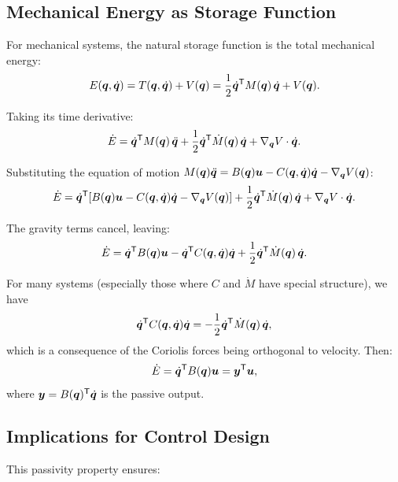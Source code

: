 \subsection{Mechanical Energy as Storage Function}

For mechanical systems, the natural storage function is the total mechanical energy:
\begin{equation}
E(\bm{q},\dot{\bm{q}}) = T(\bm{q},\dot{\bm{q}}) + V(\bm{q})
= \frac{1}{2}\dot{\bm{q}}^{\mathsf{T}} M(\bm{q})\,\dot{\bm{q}} + V(\bm{q}).
\label{eq:ch3:total-energy}
\end{equation}

Taking its time derivative:
\begin{equation}
\dot E = \dot{\bm{q}}^{\mathsf{T}} M(\bm{q})\,\ddot{\bm{q}} + \frac{1}{2}\dot{\bm{q}}^{\mathsf{T}} \dot M(\bm{q})\,\dot{\bm{q}} + \nabla_{\bm{q}} V \cdot \dot{\bm{q}}.
\label{eq:ch3:energy-rate-full}
\end{equation}

Substituting the equation of motion $M(\bm{q})\ddot{\bm{q}} = B(\bm{q})\bm{u} - C(\bm{q},\dot{\bm{q}})\dot{\bm{q}} - \nabla_{\bm{q}} V(\bm{q})$:
\begin{equation}
\dot E = \dot{\bm{q}}^{\mathsf{T}} [B(\bm{q})\bm{u} - C(\bm{q},\dot{\bm{q}})\dot{\bm{q}} - \nabla_{\bm{q}} V(\bm{q})]
+ \frac{1}{2}\dot{\bm{q}}^{\mathsf{T}} \dot M(\bm{q})\,\dot{\bm{q}} + \nabla_{\bm{q}} V \cdot \dot{\bm{q}}.
\label{eq:ch3:energy-substituted}
\end{equation}

The gravity terms cancel, leaving:
\begin{equation}
\dot E = \dot{\bm{q}}^{\mathsf{T}} B(\bm{q})\bm{u} - \dot{\bm{q}}^{\mathsf{T}} C(\bm{q},\dot{\bm{q}})\dot{\bm{q}} + \frac{1}{2}\dot{\bm{q}}^{\mathsf{T}} \dot M(\bm{q})\,\dot{\bm{q}}.
\label{eq:ch3:energy-simplified}
\end{equation}

For many systems (especially those where $C$ and $\dot M$ have special structure), we have
\begin{equation}
\dot{\bm{q}}^{\mathsf{T}} C(\bm{q},\dot{\bm{q}})\dot{\bm{q}} = -\frac{1}{2}\dot{\bm{q}}^{\mathsf{T}} \dot M(\bm{q})\,\dot{\bm{q}},
\label{eq:ch3:skew-symmetry}
\end{equation}
which is a consequence of the Coriolis forces being orthogonal to velocity. Then:
\begin{equation}
\dot E = \dot{\bm{q}}^{\mathsf{T}} B(\bm{q})\bm{u} = \bm{y}^{\mathsf{T}}\bm{u},
\label{eq:ch3:energy-passivity}
\end{equation}
where $\bm{y} = B(\bm{q})^{\mathsf{T}}\dot{\bm{q}}$ is the passive output.

\subsection{Implications for Control Design}

This passivity property ensures:

